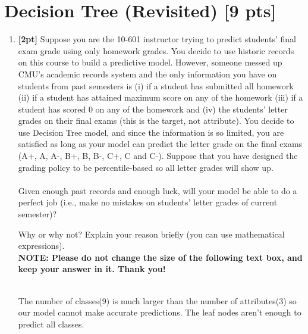 \section{Decision Tree (Revisited) [9 pts]}


\begin{enumerate}

    \item \textbf{[2pt]} Suppose you are the 10-601 instructor trying to predict students' final exam grade using only homework grades. You decide to use historic records on this course to build a predictive model. However, someone messed up CMU's academic records system and the only information you have on students from past semesters is (i) if a student has submitted all homework (ii) if a student has attained maximum score on any of the homework (iii) if a student has scored 0 on any of the homework and  (iv) the students' letter grades on their final exams (this is the target, not attribute). You decide to use Decision Tree model, and since the information is so limited, you are satisfied as long as your model can predict the letter grade on the final exams  (A+, A, A-, B+, B, B-, C+, C and C-). Suppose that you have designed the grading policy to be percentile-based so all letter grades will show up. \\ \\
    Given enough past records and enough luck, will your model be able to do a perfect job (i.e., make no mistakes on students' letter grades of current semester)?
    
    Why or why not? Explain your reason briefly (you can use mathematical expressions).\\
    
    \textbf{NOTE: Please do not change the size of the following text box, and keep your answer in it. Thank you!} \\ \\
    \begin{tcolorbox}[fit,height=2cm, width=15cm, blank, borderline={1pt}{-2pt},nobeforeafter]
    \large
    The number of classes(9) is much larger than the number of attributes(3) so our model cannot make accurate predictions. The leaf nodes aren't enough to predict all classes.

    \end{tcolorbox} \\
    

\end{enumerate}
